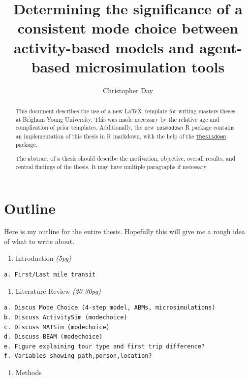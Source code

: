 \documentclass[12pt, oneside, openright]{byuthesis}
\title{Determining the significance of a consistent mode choice between activity-based models and agent-based microsimulation tools}
\author{Christopher Day}
\providecommand{\tightlist}{%
  \setlength{\itemsep}{0pt}\setlength{\parskip}{0pt}}
\begin{document}
\begin{abstract}
This document describes the use of a new \LaTeX ~template for writing masters
theses at Brigham Young University. This was made necessary by the relative age
and complication of prior templates. Additionally, the new \texttt{cosmodown} R package
contains an implementation of this thesis in R markdown, with the help of the
\href{https://github.com/ismayc/thesisdown}{\texttt{thesisdown}} package.

The abstract of a thesis should describe the
motivation, objective, overall results, and central findings of the thesis.
It may have multiple paragraphs if necessary.
\end{abstract}


\makefrontmatter %
\thesisbody

\hypertarget{outline}{%
\chapter{Outline}\label{outline}}

Here is my outline for the entire thesis. Hopefully this will give me a rough idea of what to write about.

\begin{enumerate}
\def\labelenumi{\arabic{enumi}.}
\tightlist
\item
  Introduction \emph{(5pg)}
\end{enumerate}

\begin{verbatim}
a. First/Last mile transit
\end{verbatim}

\begin{enumerate}
\def\labelenumi{\arabic{enumi}.}
\setcounter{enumi}{1}
\tightlist
\item
  Literature Review \emph{(20-30pg)}
\end{enumerate}

\begin{verbatim}
a. Discus Mode Choice (4-step model, ABMs, microsimulations)
b. Discuss ActivitySim (modechoice)
c. Discuss MATSim (modechoice)
d. Discuss BEAM (modechoice)
e. Figure explaining tour type and first trip difference?
f. Variables showing path,person,location?
\end{verbatim}

\begin{enumerate}
\def\labelenumi{\arabic{enumi}.}
\setcounter{enumi}{2}
\tightlist
\item
  Methods
\end{enumerate}
\end{document}
